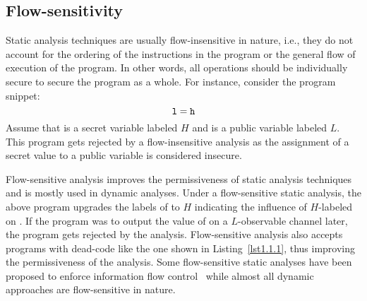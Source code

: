 \subsection{Flow-sensitivity}
Static analysis techniques are usually flow-insensitive in
nature, i.e., they do not account for the ordering of the instructions
in the program or the general flow of execution of the program. In
other words, all operations should be individually secure to secure
the program as a whole. 
%
%
For instance, consider the program snippet:
$$\texttt{l} = \texttt{h} $$
Assume that  is a secret variable labeled $H$
and  is a public variable labeled $L$. This program gets
rejected by a flow-insensitive analysis as the assignment of a secret
value to a public variable is considered insecure.  

Flow-sensitive analysis improves the permissiveness of static analysis
techniques and is mostly used in dynamic analyses. Under a
flow-sensitive static analysis, the above program 
upgrades the labels of  to $H$ indicating the
influence of $H$-labeled  on . If the program was to
output the value of  on a $L$-observable channel later, the
program gets rejected by the analysis. Flow-sensitive analysis also
accepts programs with dead-code like the one shown in
Listing~\ref{lst1.1.1}, 
thus improving the permissiveness of the analysis. Some 
flow-sensitive static analyses have been proposed to enforce
information flow control~\cite{hunt2006:types,hammer09ijis} while
almost all dynamic approaches are flow-sensitive in nature. 

